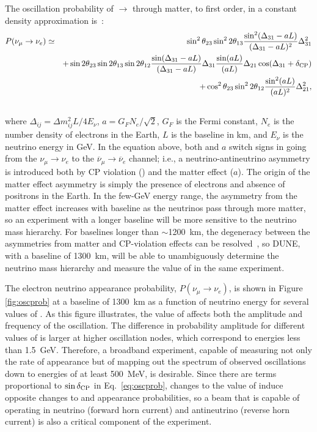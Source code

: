 The oscillation probability of \numu $\rightarrow$ \nue through matter, 
to first order, in a constant density
approximation is~\cite{Nunokawa:2007qh}:
%
\begin{eqnarray}
\label{eq:oscprob}
P(\nu_\mu \rightarrow \nu_e) & \simeq & \sin^2 \theta_{23} \sin^2 2 \theta_{13} 
\frac{ \sin^2(\Delta_{31} - aL)}{(\Delta_{31}-aL)^2} \Delta_{31}^2\\ \nonumber
& & + \sin 2 \theta_{23} \sin 2 \theta_{13} \sin 2 \theta_{12} \frac{ \sin(\Delta_{31} - aL)}{(\Delta_{31}-aL)} \Delta_{31} \frac{\sin(aL)}{(aL)} \Delta_{21} \cos (\Delta_{31} + \mdeltacp)\\ \nonumber
& & + \cos^2 \theta_{23} \sin^2 2 \theta_{12} \frac {\sin^2(aL)}{(aL)^2} \Delta_{21}^2, \\ \nonumber
\label{eqn:appprob}
\end{eqnarray}
where $\Delta_{ij} = \Delta m^2_{ij} L/4E_\nu$, $a = G_FN_e/\sqrt{2}$, $G_F$ is the Fermi constant, $N_e$ is the number density of electrons in the Earth, $L$ is the baseline in km, and $E_\nu$ is the neutrino energy in GeV. 
In the equation above, both \deltacp and $a$ 
switch signs in going from the
$\nu_\mu \to \nu_e$ to the $\overline{\nu}_\mu \to \overline{\nu}_e$ channel; i.e.,
a neutrino-antineutrino asymmetry is introduced both by CP violation (\deltacp)
and the matter effect ($a$). The origin of the matter effect asymmetry 
is simply the presence of electrons and absence of positrons in the Earth.  
In the few-GeV energy range, the asymmetry from the matter effect increases with baseline as the neutrinos
pass through more matter, so an experiment with a longer baseline will be
more sensitive to the neutrino mass hierarchy. For baselines longer than 
$\sim$1200~km, the degeneracy between the asymmetries from matter
and CP-violation effects can be resolved~\cite{Bass:2013vcg}, so DUNE, with a baseline of 1300~km, 
will be able to unambiguously
determine the neutrino mass hierarchy and measure the value of \deltacp in the same experiment.

The electron neutrino appearance probability, $P(\nu_\mu \rightarrow \nu_e)$, 
is shown in 
Figure \ref{fig:oscprob} 
at a baseline of 1300~km as a function of neutrino 
energy for several values of \deltacp. As this figure illustrates, the value 
of \deltacp affects both the amplitude and frequency of
the oscillation. The difference in probability amplitude
for different values of \deltacp is larger at higher oscillation nodes, which 
correspond to energies less than 1.5~GeV. Therefore, a broadband experiment, 
capable of measuring not only the rate of \nue appearance but of mapping out the 
spectrum of observed oscillations down to energies of at least 500~MeV, 
is desirable. Since there are terms proportional to $\sin\mdeltacp$ in Eq.~\ref{eq:oscprob},
changes to the value of \deltacp induce opposite changes to \nue and
\anue appearance probabilities, so a beam that is capable of operating in
neutrino (forward horn current) and antineutrino (reverse horn current)
is also a critical component of the experiment.

